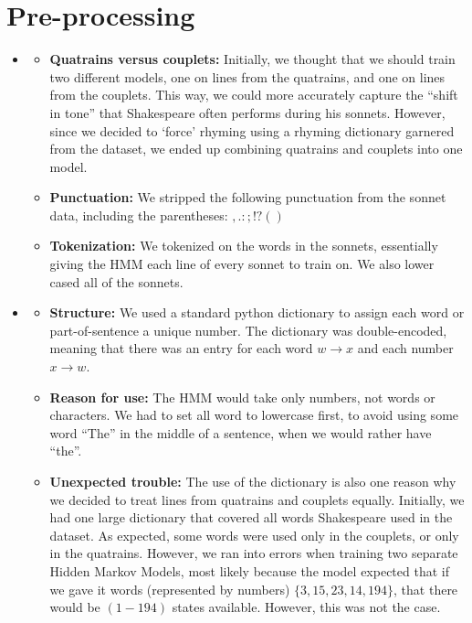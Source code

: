 \section{Pre-processing}
\medskip
\begin{itemize}

    \item {}
    \begin{itemize}
        \item \textbf{Quatrains versus couplets:} Initially, we thought that we should train two different models, one on lines from the quatrains, and one on lines from the couplets. This way, we could more accurately capture the ``shift in tone'' that Shakespeare often performs during his sonnets. However, since we decided to `force' rhyming using a rhyming dictionary garnered from the dataset, we ended up combining quatrains and couplets into one model.
        \item \textbf{Punctuation:} We stripped the following punctuation from the sonnet data, including the parentheses: $,.:;!?()$
        \item \textbf{Tokenization:} We tokenized on the words in the sonnets,
        essentially giving the HMM each line of every sonnet to train on. We
        also lower cased all of the sonnets.
    \end{itemize}
    \item {}
    \begin{itemize}
        \item \textbf{Structure:} We used a standard python dictionary to assign each word or part-of-sentence a unique number. The dictionary was double-encoded, meaning that there was an entry for each word $w \rightarrow x$ and each number $x \rightarrow w$.
        \item \textbf{Reason for use:} The HMM would take only numbers, not words or characters. We had to set all word to lowercase first, to avoid using some word ``The'' in the middle of a sentence, when we would rather have ``the''. 
        \item \textbf{Unexpected trouble:} The use of the dictionary is also one reason why we decided to treat lines from quatrains and couplets equally. Initially, we had one large dictionary that covered all words Shakespeare used in the dataset. As expected, some words were used only in the couplets, or only in the quatrains. However, we ran into errors when training two separate Hidden Markov Models, most likely because the model expected that if we gave it words (represented by numbers) $\{ 3, 15, 23, 14, 194\}$, that there would be $(1-194)$ states available. However, this was not the case. 
    \end{itemize}


\end{itemize}

